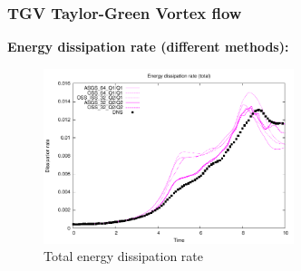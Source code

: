 \begin{frame}
 \frametitle{TGV {\small Taylor-Green Vortex flow}}
 \textbf{Energy dissipation rate (different methods):}
 \vspace*{-0.3cm}
   \begin{figure}
     \centering	
     \includegraphics[width=0.65\textwidth]{Figures/oss_64_tot.pdf}
     \vspace*{-0.3cm}
     \caption{Total energy dissipation rate}
   \end{figure}
 \begin{overlayarea}{\textwidth}{1.5cm}
  \end{overlayarea}
\end{frame}
